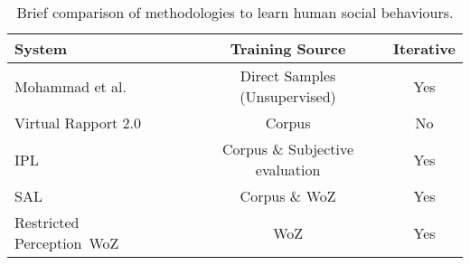 \begin{table}[H]
	\centering
	\begin{tabular}{|l|c|c|}
		\hline
		\textbf{System}              	& \textbf{Training Source} 	& \textbf{Iterative} \\ \hline
		Mohammad et al.~\cite{Mohammad2010} & Direct Samples (Unsupervised) & Yes \\ \hline
		Virtual Rapport 2.0~\cite{Buschmeier2011} 			& Corpus			& No \\ \hline
		\acf{IPL}~\cite{Kok2012}          				& Corpus \& Subjective evaluation			& Yes \\ \hline
		\acf{SAL}~\cite{Schroder2012} & Corpus \& \ac{WoZ}		& Yes \\ \hline
		Restricted Perception~\acf{WoZ}~\cite{Sequeira2016}  & \ac{WoZ}		& Yes \\ \hline
		
	\end{tabular}
	\caption{Brief comparison of methodologies to learn human social behaviours.}
	\label{fig:comparison:vh:systems}
\end{table}

